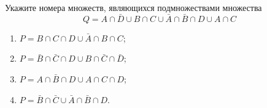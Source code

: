 \question
Укажите номера множеств, являющихся подмножествами множества
\begin{equation*}
	Q = A \cap \bar{D} \cup B \cap C \cup \bar{A} \cap \bar{B} \cap D \cup A \cap C
\end{equation*}

\begin{enumerate}
	\renewcommand{\labelenumi}{\arabic{enumi})}
	\item $P = B \cap C \cap D \cup \bar{A} \cap B \cap C$;
	\item $P = \bar{B} \cap \bar{C} \cap D \cup B \cap \bar{C} \cap \bar{D}$;
	\item $P = A \cap \bar{B} \cap D \cup A \cap C \cap D$;
	\item $P = \bar{B} \cap \bar{C} \cup \bar{A} \cap \bar{B} \cap D$.
\end{enumerate}
